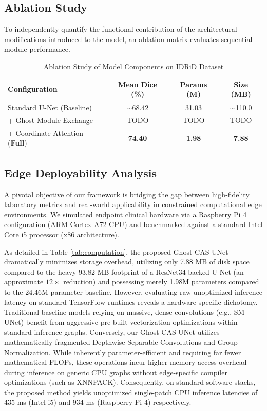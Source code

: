 \subsection{Ablation Study}
To independently quantify the functional contribution of the architectural modifications introduced to the model, an ablation matrix evaluates sequential module performance.

\begin{table}[htbp]
\caption{Ablation Study of Model Components on IDRiD Dataset}
\begin{center}
\begin{tabular}{l c c c}
\toprule
\textbf{Configuration} & \textbf{Mean Dice (\%)} & \textbf{Params (M)} & \textbf{Size (MB)} \\
\midrule
Standard U-Net (Baseline) & $\sim$68.42 & 31.03 & $\sim$110.0 \\
+ Ghost Module Exchange & TODO & TODO & TODO\\
+ Coordinate Attention (\textbf{Full}) & \textbf{74.40} & \textbf{1.98} & \textbf{7.88} \\
\bottomrule
\end{tabular}
\label{tab:ablation}
\end{center}
\end{table}

\subsection{Edge Deployability Analysis}
A pivotal objective of our framework is bridging the gap between high-fidelity laboratory metrics and real-world applicability in constrained computational edge environments. We simulated endpoint clinical hardware via a Raspberry Pi 4 configuration (ARM Cortex-A72 CPU) and benchmarked against a standard Intel Core i5 processor (x86 architecture). 

As detailed in Table \ref{tab:computation}, the proposed Ghost-CAS-UNet dramatically minimizes storage overhead, utilizing only 7.88 MB of disk space compared to the heavy 93.82 MB footprint of a ResNet34-backed U-Net (an approximate $12\times$ reduction) and possessing merely 1.98M parameters compared to the 24.46M parameter baseline. However, evaluating raw unoptimized inference latency on standard TensorFlow runtimes reveals a hardware-specific dichotomy. Traditional baseline models relying on massive, dense convolutions (e.g., SM-UNet) benefit from aggressive pre-built vectorization optimizations within standard inference graphs. Conversely, our Ghost-CAS-UNet utilizes mathematically fragmented Depthwise Separable Convolutions and Group Normalization. While inherently parameter-efficient and requiring far fewer mathematical FLOPs, these operations incur higher memory-access overhead during inference on generic CPU graphs without edge-specific compiler optimizations (such as XNNPACK). Consequently, on standard software stacks, the proposed method yields unoptimized single-patch CPU inference latencies of 435 ms (Intel i5) and 934 ms (Raspberry Pi 4) respectively.

